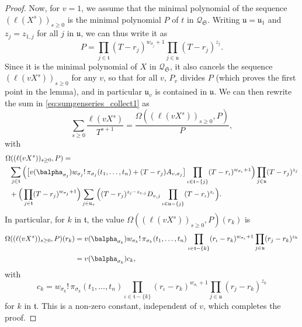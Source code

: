 \documentclass[12pt]{article}
\newcommand{\minpoly}{P}
\newcommand{\lf}{X}
\newcommand{\residueI}{\mathscr{Q}}
\begin{document}
\begin{proof}
  Now, for $v=1$, we assume that the minimal polynomial of the sequence
  $(\ell(\lf^s))_{s \ge 0}$ is the minimal polynomial $\minpoly$ of $t$ in
  $\residueI_\mathfrak{S}$.  Writing $\mathfrak{u}=\mathfrak{u}_1$ and
  $z_j=z_{1,j}$ for all $j$ in $\mathfrak{u}$, we can thus write it as
  $$\minpoly=\prod_{j \in \mathfrak{t}} (T-r_{j})^{w_{\sigma_{j}}+1}
  \prod_{j \in \mathfrak{u}} (T-r_{j})^{z_{j}}.$$ Since it is the
  minimal polynomial of $\lf$ in $\residueI_\mathfrak{S}$, it also cancels the
  sequence $(\ell(v \lf^s))_{s \ge 0}$ for any $v$, so that for all
  $v$, $\minpoly_v$ divides $\minpoly$ (which proves the first point
  in the lemma), and in particular $\mathfrak{u}_v$ is contained in
  $\mathfrak{u}$.
  We can then rewrite the
  sum in \cref{eq:sumgenseries_collect1} as $$ \sum_{s \ge 0} \frac{\ell(v \lf^s)}{T^{s+1}} =\frac{\Omega((\ell(v \lf^s))_{s \ge 0} ,\minpoly)}{\minpoly},$$ with
  \begin{align*}
    & \Omega((\ell(v \lf^s))_{s \ge 0} ,\minpoly)= \\
    &\;\; \sum_{j \in \mathfrak{t}} \Big(\big[
      v(\balpha_{\sigma_{j}})  w_{\sigma_j}!\, \pi_{\sigma_j}(t_1,\dots,t_n)
      + (T-r_j) A_{v,\sigma_j}\big]
    \prod_{\iota \in \mathfrak{t}-\{j\}}(T-r_{\iota} )^{w_{\sigma_{\iota}}+1}
    \Big)\prod_{j \in \mathfrak{u}}(T-r_j )^{z_j}
    \\
    &\;\; +
    \Big(\prod_{j \in \mathfrak{t}}(T-r_{j} )^{w_{\sigma_j}+1}\Big)
    \sum_{j \in \mathfrak{u}_v} \Big (
    (T-r_j)^{z_{j}-z_{v,j}} D_{v,j}
    \prod_{\iota \in \mathfrak{u}-\{j\}}(T-r_{\iota} )^{z_{\iota}}\Big).
  \end{align*}
  In particular, 
  for $k$ in $\mathfrak{t}$,
  the value $\Omega((\ell(v \lf^s))_{s \ge 0} ,\minpoly)(r_k)$ is 
  \begin{align*}
    \Omega((\ell(v \lf^s))_{s \ge 0} ,\minpoly)(r_k)&= v(\balpha_{\sigma_{k}}) w_{\sigma_k}!\, \pi_{\sigma_k}(t_1,\dots,t_n)
    \prod_{\iota \in \mathfrak{t}-\{k\}}(r_\iota-r_{k} )^{w_{\sigma_{\iota}}+1}
    \prod_{j \in \mathfrak{u}}(r_j-r_{k} )^{z_{k}}\\
    &= v(\balpha_{\sigma_{k}}) c_{k},
  \end{align*}
  with 
  $$c_{k}=
  w_{\sigma_k}!\, \pi_{\sigma_k}(t_1,\dots,t_n)
  \prod_{\iota \in \mathfrak{t}-\{k\}}(r_\iota-r_{k} )^{w_{\sigma_{\iota}}+1}
  \prod_{j \in \mathfrak{u}}(r_j-r_{k} )^{z_{k}}$$
  for $k$ in $\mathfrak{t}$. This is a non-zero constant, independent 
  of $v$, which completes the proof.
\end{proof}
\end{document}
